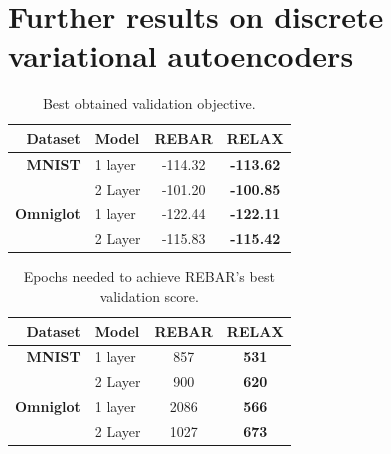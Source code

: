\documentclass{article}
\begin{document}
\section{Further results on discrete variational autoencoders}
\label{extra vae results}

\begin{table}[h]
\centering
\begin{tabular}{r l | c c} 
  Dataset & Model & REBAR & RELAX \\\midrule
\textbf{MNIST} & 1 layer  & -114.32 & \textbf{-113.62} \\ 
& 2 Layer  & -101.20 & \textbf{-100.85} \\ \midrule
\textbf{Omniglot} & 1 layer & -122.44 & \textbf{-122.11} \\ 
& 2 Layer & -115.83 & \textbf{-115.42}
\end{tabular}
\caption{Best obtained validation objective.}
\label{tab:vae val}
\end{table}


\begin{table}[h]
\centering
\begin{tabular}{r l | c c} 
 Dataset & Model  & REBAR & RELAX \\\midrule
\textbf{MNIST} & 1 layer  & 857 & \textbf{531} \\ 
& 2 Layer  & 900 & \textbf{620} \\
\midrule
\textbf{Omniglot} & 1 layer & 2086 & \textbf{566} \\ 
& 2 Layer & 1027 & \textbf{673}
\end{tabular}
\caption{Epochs needed to achieve REBAR's best validation score.}
\label{tab:vae epochs}
\end{table}
\end{document}
